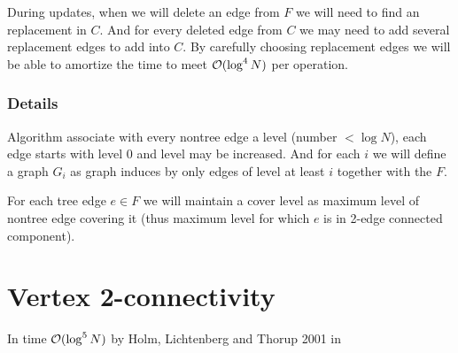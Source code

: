 During updates, when we will delete an edge from $F$ we will need to find an
replacement in $C$. And for every deleted edge from $C$ we may need to add
several replacement edges to add into $C$. By carefully choosing replacement
edges we will be able to amortize the time to meet ${\cal O}(\log^4 N)$ per operation.

\subsubsection{Details}

Algorithm associate with every nontree edge a level (number $< \log N$), each
edge starts with level 0 and level may be increased. And for each $i$ we will
define a graph $G_i$ as graph induces by only edges of level at least $i$
together with the $F$.

For each tree edge $e \in F$ we will maintain a cover level as maximum level of
nontree edge covering it (thus maximum level for which $e$ is in 2-edge
connected component).


\section{Vertex 2-connectivity}

In time ${\cal O}(\log^5 N)$ by Holm, Lichtenberg and Thorup 2001 in \cite{PolylogarithmicAlgorithmsForConnectivity}

